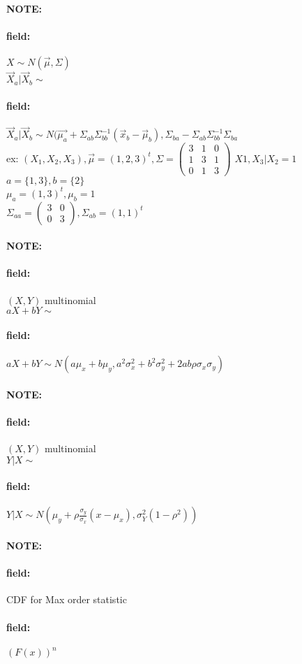 \documentclass[12pt]{article}
\newenvironment{note}{\paragraph{NOTE:}}{}
\newenvironment{field}{\paragraph{field:}}{}
\begin{document}
\begin{note}
  \begin{field}
    $X \sim N(\vec{\mu},\Sigma) $\\

    $\vec{X}_a | \vec{X}_b \sim $
  \end{field}
  \begin{field}
    $\vec{X}_a | \vec{X}_b \sim N\big(\vec{\mu_a} + \Sigma_{ab} \Sigma^{-1}_{bb}(\vec{x}_b - \vec{\mu}_b), \Sigma_{ba} - \Sigma_{ab}\Sigma_{bb}^{-1}\Sigma_{ba}$\\

ex: $(X_1,X_2,X_3), \vec{\mu} = (1,2,3)^t, \Sigma = \begin{pmatrix}
  3 & 1 & 0 \\ 1 & 3 & 1 \\ 0 & 1 & 3
\end{pmatrix}$
$X1,X_3 | X_2 = 1$\\
$a = \{1,3\}, b = \{2\}$\\
$\mu_a = (1,3)^t, \mu_b = 1$\\
$\Sigma_{aa} = \begin{pmatrix}
  3 & 0 \\ 0 & 3
\end{pmatrix}, \Sigma_{ab} = (1,1)^t$

  \end{field}
\end{note}

\begin{note}
  \begin{field}
    $(X,Y)$ multinomial \\
    $aX + bY \sim $
  \end{field}
  \begin{field}
    $aX + bY \sim N(a \mu_x + b\mu_y, a^2 \sigma_x^2 + b^2 \sigma_y^2 + 2 ab \rho \sigma_x \sigma_y)$
  \end{field}
\end{note}

\begin{note}
  \begin{field}
    $(X,Y)$ multinomial \\
    $Y|X\sim $
  \end{field}
  \begin{field}
    $Y|X\sim  N(\mu_y + \rho \frac{\sigma_y}{\sigma_x}(x - \mu_x), \sigma_Y^2(1 - \rho^2))$
  \end{field}
\end{note}

\begin{note}
  \begin{field}
    CDF for Max order statistic
  \end{field}
  \begin{field}
    $(F(x))^n$
  \end{field}
\end{note}
\end{document}
